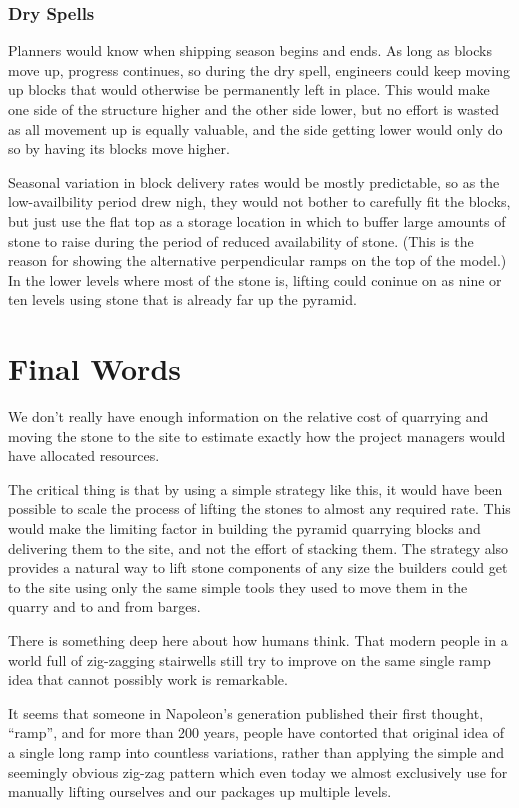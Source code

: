 \documentclass[letterpaper,11pt]{article}
\begin{document}
\subsubsection{Dry Spells}
Planners would know when shipping season begins and ends. 
As long as blocks move up, progress continues, so during the dry spell, engineers could keep moving up blocks that would otherwise
be permanently left in place.
This would make one side of the structure higher and the other side lower, but no effort is wasted as all movement 
up is equally valuable, and the side getting lower would only do so by having its blocks move higher. 

Seasonal variation in block delivery rates would be mostly predictable, so as the low-availbility period drew nigh,
they would not bother to carefully fit the blocks, but just use the flat top as a storage location in which to buffer large
amounts of stone to raise during the period of reduced availability of stone. 
(This is the reason for showing the alternative perpendicular ramps on the top of the model.)
In the lower levels where most of the stone is, lifting could coninue on as nine or ten levels using stone that is already far
up the pyramid.

\section{Final Words }

We don't really have enough information on the relative cost of quarrying and moving the stone to the site to estimate exactly 
how the project managers would have allocated resources. 

The critical thing is that by using a simple strategy like this, it would have been possible to scale the process of lifting 
the stones to almost any required rate. 
This would make the limiting factor in building the pyramid quarrying blocks and delivering them to the 
site, and not the effort of stacking them.
The strategy also provides a natural way to lift stone components of any size the builders could get to the site using only 
the same simple tools they used to move them in the quarry and to and from barges. 

There is something deep here about how humans think.  
That modern people in a world full of zig-zagging stairwells still try to improve on the same single ramp idea 
that cannot possibly work is remarkable.  

It seems that someone in Napoleon's generation published their first thought, ``ramp'', and for more than 200 years, people have 
contorted that original idea of a single long ramp into countless variations, rather than applying the simple and 
seemingly obvious zig-zag pattern which even today we almost exclusively use for manually lifting ourselves and our 
packages up multiple levels.

\theendnotes
\end{document}
